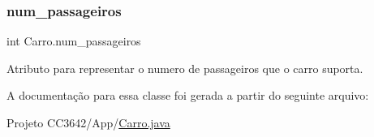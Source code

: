 \subsubsection{\texorpdfstring{num\+\_\+passageiros}{num\_passageiros}}
{\footnotesize\ttfamily int Carro.\+num\+\_\+passageiros\hspace{0.3cm}{\ttfamily [private]}}



Atributo para representar o numero de passageiros que o carro suporta. 



A documentação para essa classe foi gerada a partir do seguinte arquivo\+:\begin{DoxyCompactItemize}
\item 
Projeto C\+C3642/\+App/\mbox{\hyperlink{_carro_8java}{Carro.\+java}}\end{DoxyCompactItemize}
